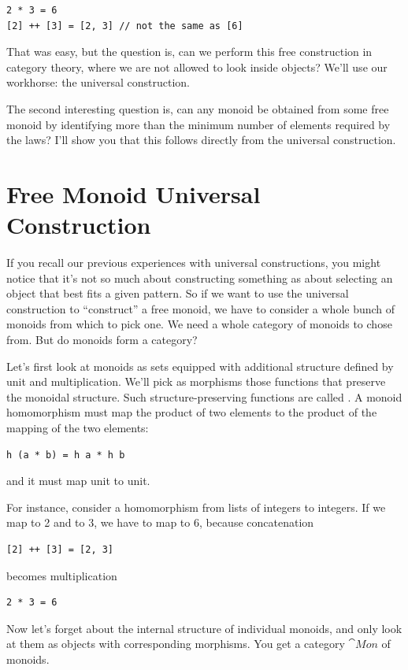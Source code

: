 \begin{Verbatim}
2 * 3 = 6
[2] ++ [3] = [2, 3] // not the same as [6]
\end{Verbatim}
That was easy, but the question is, can we perform this free
construction in category theory, where we are not allowed to look inside
objects? We'll use our workhorse: the universal construction.

The second interesting question is, can any monoid be obtained from some
free monoid by identifying more than the minimum number of elements
required by the laws? I'll show you that this follows directly from the
universal construction.

\section{Free Monoid Universal Construction}

If you recall our previous experiences with universal constructions, you
might notice that it's not so much about constructing something as about
selecting an object that best fits a given pattern. So if we want to use
the universal construction to ``construct'' a free monoid, we have to
consider a whole bunch of monoids from which to pick one. We need a
whole category of monoids to chose from. But do monoids form a category?

Let's first look at monoids as sets equipped with additional structure
defined by unit and multiplication. We'll pick as morphisms those
functions that preserve the monoidal structure. Such
structure-preserving functions are called . A monoid
homomorphism must map the product of two elements to the product of the
mapping of the two elements:

\begin{Verbatim}
h (a * b) = h a * h b
\end{Verbatim}
and it must map unit to unit.

For instance, consider a homomorphism from lists of integers to
integers. If we map \code{{[}2{]}} to 2 and \code{{[}3{]}} to 3, we
have to map \code{{[}2, 3{]}} to 6, because concatenation

\begin{Verbatim}
[2] ++ [3] = [2, 3]
\end{Verbatim}
becomes multiplication

\begin{Verbatim}
2 * 3 = 6
\end{Verbatim}
Now let's forget about the internal structure of individual monoids, and
only look at them as objects with corresponding morphisms. You get a
category $\cat{Mon}$ of monoids.

